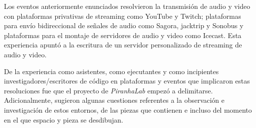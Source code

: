 Los eventos anteriormente enunciados resolvieron la transmisión de audio y video con  plataformas privativas de streaming como YouTube y Twitch; plataformas para envío bidireccional de señales de audio como Sagora, jacktrip y Sonobus y plataformas para el montaje de servidores de audio y video como Icecast. Esta experiencia apuntó a la escritura de un servidor personalizado de streaming de audio y video. %

De la experiencia como asistentes, como ejecutantes y como incipientes investigadores/escritores de código en plataformas y eventos que implicaron estas resoluciones fue que el proyecto de \textit{PiranhaLab} empezó a delimitarse. Adicionalmente, sugieron algunas cuestiones referentes a la observación e investigación de estos entornos, de las piezas que contienen e incluso del momento en el que espacio y pieza se desdibujan. 
